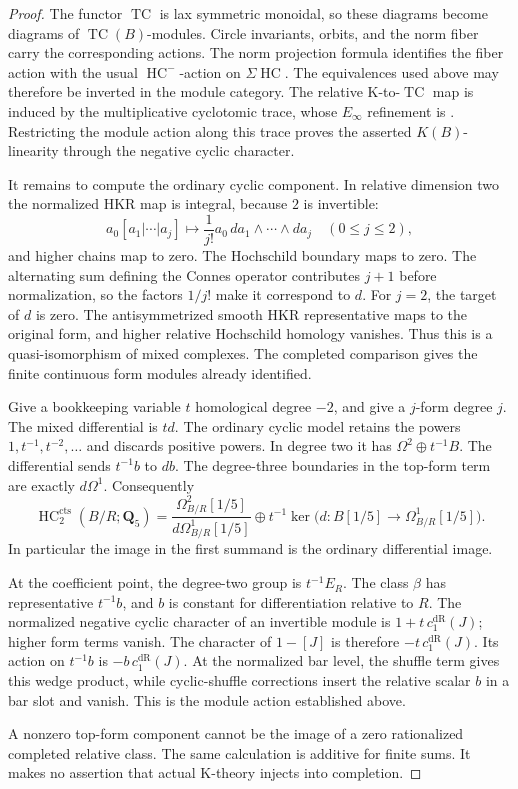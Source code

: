 \documentclass[11pt,a4paper]{amsart}
\numberwithin{equation}{section}
\theoremstyle{definition}
\theoremstyle{remark}
\newcommand{\DtwoQQ}{\mathbf{Q}}
\newcommand{\DtwodR}{\mathrm{dR}}
\newcommand{\Dtwocts}{\mathrm{cts}}
\DeclareMathOperator{\DtwoHC}{HC}
\DeclareMathOperator{\DtwoTC}{TC}
\begin{document}
\begin{proof}
The functor \(\DtwoTC\) is lax symmetric monoidal, so these diagrams
become diagrams of \(\DtwoTC(B)\)-modules.
Circle invariants, orbits, and the norm fiber carry the corresponding
actions. The norm projection formula identifies the fiber action
with the usual \(\DtwoHC^-\)-action on \(\Sigma\DtwoHC\).
The equivalences used above may therefore be inverted in the module
category.
The relative K-to-\(\DtwoTC\) map is induced by the multiplicative
cyclotomic trace, whose \(E_\infty\) refinement is
\cite[Theorem~7.4]{BGTTrace}.
Restricting the module action along this trace proves the asserted
\(K(B)\)-linearity through the negative cyclic character.

It remains to compute the ordinary cyclic component.
In relative dimension two the normalized HKR map is integral,
because \(2\) is invertible:
\[
 a_0[a_1|\cdots|a_j]\longmapsto
 \frac1{j!}a_0\,da_1\wedge\cdots\wedge da_j
 \quad (0\le j\le2),
\]
and higher chains map to zero.
The Hochschild boundary maps to zero.
The alternating sum defining the Connes operator contributes
\(j+1\) before normalization, so the factors \(1/j!\) make it
correspond to \(d\).
For \(j=2\), the target of \(d\) is zero.
The antisymmetrized smooth HKR representative maps to the original
form, and higher relative Hochschild homology vanishes.
Thus this is a quasi-isomorphism of mixed complexes.
The completed comparison gives the finite continuous form modules
already identified.

Give a bookkeeping variable \(t\) homological degree \(-2\), and give
a \(j\)-form degree \(j\).
The mixed differential is \(td\).
The ordinary cyclic model retains the powers
\(1,t^{-1},t^{-2},\ldots\) and discards positive powers.
In degree two it has \(\Omega^2\oplus t^{-1}B\).
The differential sends \(t^{-1}b\) to \(db\).
The degree-three boundaries in the top-form term are exactly
\(d\Omega^1\).
Consequently
\begin{equation}\label{d2:eq:hc-two}
 \DtwoHC_2^\Dtwocts(B/R;\DtwoQQ_5)=
 \frac{\Omega^2_{B/R}[1/5]}{d\Omega^1_{B/R}[1/5]}
 \oplus
 t^{-1}\ker\bigl(d\colon B[1/5]\to\Omega^1_{B/R}[1/5]\bigr).
\end{equation}
In particular the image in the first summand is the ordinary
differential image.

At the coefficient point, the degree-two group is \(t^{-1}E_R\).
The class \(\beta\) has representative \(t^{-1}b\), and \(b\) is
constant for differentiation relative to \(R\).
The normalized negative cyclic character of an invertible module
is \(1+t\,c_1^\DtwodR(J)\); higher form terms vanish.
The character of \(1-[J]\) is therefore \(-t\,c_1^\DtwodR(J)\).
Its action on \(t^{-1}b\) is \(-b\,c_1^\DtwodR(J)\).
At the normalized bar level, the shuffle term gives this wedge
product, while cyclic-shuffle corrections insert the relative scalar
\(b\) in a bar slot and vanish.
This is the module action established above.

A nonzero top-form component cannot be the image of a zero
rationalized completed relative class.
The same calculation is additive for finite sums.
It makes no assertion that actual K-theory injects into completion.
\end{proof}
\end{document}
